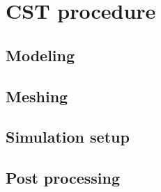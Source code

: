 \chapter{CST procedure}

\section{Modeling}

\section{Meshing}

\section{Simulation setup}

\section{Post processing}